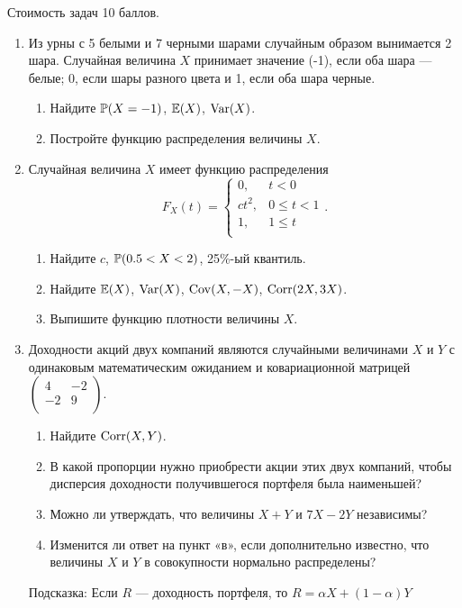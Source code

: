 Стоимость задач 10 баллов.

\begin{enumerate}
\item Из урны с 5 белыми и 7 черными шарами случайным образом вынимается
2 шара. Случайная величина $X$ принимает значение (-1), если оба
шара — белые; 0, если шары разного цвета и 1, если оба шара
черные.
\begin{enumerate}
\item Найдите $\P(X=-1)$, $\E(X)$, $\Var(X)$.
\item Постройте функцию распределения величины $X$.
\end{enumerate}

\item Случайная величина $X$ имеет функцию распределения
\[
F_{X}(t)=
\begin{cases}
  0, & t<0 \\
  ct^{2}, & 0\le t <1 \\
  1, & 1\le t \\
\end{cases}.
\]
\begin{enumerate}
\item Найдите $c$, $\P(0.5<X<2)$, 25\%-ый квантиль.
\item Найдите $\E(X)$, $\Var(X)$, $\Cov(X,-X)$, $\Corr(2X,3X)$.
\item Выпишите функцию плотности величины $X$.
\end{enumerate}

\item Доходности акций двух компаний являются случайными величинами $X$
и $Y$ с одинаковым математическим ожиданием и ковариационной
матрицей  $\left(%
\begin{array}{cc}
  4 & -2 \\
  -2 & 9 \\
\end{array}%
\right).$
\begin{enumerate}
\item Найдите $\Corr(X,Y)$.
\item В какой пропорции нужно приобрести акции этих двух
компаний, чтобы дисперсия доходности получившегося портфеля была наименьшей?
\item Можно ли утверждать, что величины $X+Y$ и $7X-2Y$ независимы?
\item Изменится ли ответ на пункт «в», если дополнительно
известно, что величины $X$ и $Y$ в совокупности нормально распределены?
\end{enumerate}
Подсказка: Если $R$ — доходность портфеля, то $R=\alpha
X+(1-\alpha)Y$


\end{enumerate}
